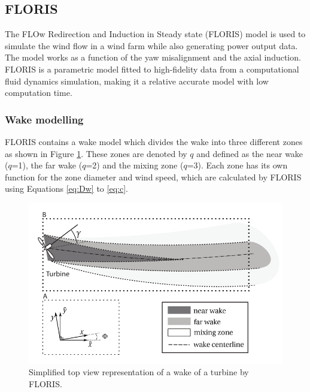 
\subsection{FLORIS} \label{sec:floris} The FLOw Redirection and Induction in Steady state (FLORIS) model is used to simulate the wind flow in a wind farm while also generating power output data. The model works as a function of the yaw misalignment and the axial induction\cite{Gebraad2016}. FLORIS is a parametric model fitted to high-fidelity data from a computational fluid dynamics simulation, making it a relative accurate model with low computation time\cite{Dijk2016}. 

\subsubsection{Wake modelling}
\label{wakemodel}
FLORIS contains a wake model which divides the wake into three different zones as shown in Figure \ref{fig:wake}. These zones are denoted by $q$ and defined as the near wake ($q$=1), the far wake ($q$=2) and the mixing zone ($q$=3). Each zone has its own function for the zone diameter and wind speed, which are calculated by FLORIS using Equations \ref{eq:Dw} to \ref{eq:c}. 


\begin{figure}
  	\includegraphics[width=\linewidth]{./Figures/WakeFLORIS.png}
  	\caption{Simplified top view representation of a wake of a turbine by FLORIS\cite{Gebraad2016}.}
	\label{fig:wake}
\end{figure}

